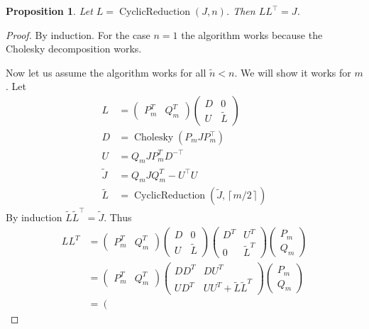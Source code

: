 \documentclass{article}
\newtheorem{prop}{Proposition}
\theoremstyle{definition}
\DeclareMathOperator{\CyclicReduction}{CyclicReduction}
\DeclareMathOperator{\chol}{Cholesky}
\begin{document}
\begin{prop}
Let $L=\CyclicReduction\left(J,n\right)$.  Then $LL^\top = J$.
\end{prop}
\begin{proof}
By induction.  For the case $n=1$ the algorithm works because the Cholesky decomposition works.  

Now let us assume the algorithm works for all $\tilde n<n$.  We will show it works for $m$.  Let
\begin{align*}
L&=\left(\begin{array}{cc}
P_{m}^{T} & Q_{m}^{T}\end{array}\right)\left(\begin{array}{cc}
D & 0\\
U & \tilde L
\end{array}\right)\\
D & =\chol\left(P_{m}JP_{m}^{\top}\right)\\
U & =Q_{m}JP_{m}^{T}D^{-\top}\\
\tilde{J} & =Q_{m}JQ_{m}^{T}-U^{\top}U\\
\tilde{L} &= \CyclicReduction\left(\tilde{J},\left\lceil m/2\right\rceil \right)
\end{align*}
By induction $\tilde L \tilde L^\top = \tilde J$.  Thus
\begin{align*}
LL^{T}&=\left(\begin{array}{cc}
P_{m}^{T} & Q_{m}^{T}\end{array}\right)\left(\begin{array}{cc}
D & 0\\
U & \tilde{L}
\end{array}\right)\left(\begin{array}{cc}
D^{T} & U^{T}\\
0 & \tilde{L}^{T}
\end{array}\right)\left(\begin{array}{c}
P_{m}\\
Q_{m}
\end{array}\right)\\&=\left(\begin{array}{cc}
P_{m}^{T} & Q_{m}^{T}\end{array}\right)\left(\begin{array}{cc}
DD^{T} & DU^{T}\\
UD^{T} & UU^{T}+\tilde{L}\tilde{L}^{T}
\end{array}\right)\left(\begin{array}{c}
P_{m}\\
Q_{m}
\end{array}\right)\\&=\left(\begin{array}{cc}

\end{array}
\end{align*}
\end{proof}
\end{document}
